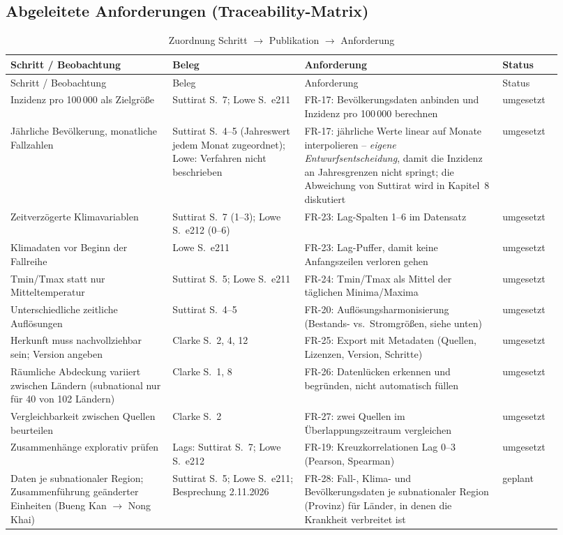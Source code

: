 \documentclass[11pt,a4paper]{article}
\begin{document}
\subsection{Abgeleitete Anforderungen (Traceability-Matrix)}

\begin{longtable}{@{}p{0.27\linewidth}p{0.22\linewidth}p{0.33\linewidth}p{0.1\linewidth}@{}}
\caption{Zuordnung Schritt $\rightarrow$ Publikation $\rightarrow$ Anforderung}\label{tab:trace}\\
\toprule
Schritt / Beobachtung & Beleg & Anforderung & Status \\
\midrule
\endfirsthead
\toprule
Schritt / Beobachtung & Beleg & Anforderung & Status \\
\midrule
\endhead
Inzidenz pro 100\,000 als Zielgröße & Suttirat S.~7; Lowe S.~e211 &
  FR-17: Bevölkerungsdaten anbinden und Inzidenz pro 100\,000 berechnen & umgesetzt \\
Jährliche Bevölkerung, monatliche Fallzahlen & Suttirat S.~4--5 (Jahreswert jedem Monat zugeordnet); Lowe: Verfahren nicht beschrieben &
  FR-17: jährliche Werte linear auf Monate interpolieren -- \emph{eigene Entwurfsentscheidung}, damit die Inzidenz an Jahresgrenzen nicht springt; die Abweichung von Suttirat wird in Kapitel~8 diskutiert & umgesetzt \\
Zeitverzögerte Klimavariablen & Suttirat S.~7 (1--3); Lowe S.~e212 (0--6) &
  FR-23: Lag-Spalten 1--6 im Datensatz & umgesetzt \\
Klimadaten vor Beginn der Fallreihe & Lowe S.~e211 &
  FR-23: Lag-Puffer, damit keine Anfangszeilen verloren gehen & umgesetzt \\
Tmin/Tmax statt nur Mitteltemperatur & Suttirat S.~5; Lowe S.~e211 &
  FR-24: Tmin/Tmax als Mittel der täglichen Minima/Maxima & umgesetzt \\
Unterschiedliche zeitliche Auflösungen & Suttirat S.~4--5 &
  FR-20: Auflösungsharmonisierung (Bestands- vs.\ Stromgrößen, siehe unten) & umgesetzt \\
Herkunft muss nachvollziehbar sein; Version angeben & Clarke S.~2, 4, 12 &
  FR-25: Export mit Metadaten (Quellen, Lizenzen, Version, Schritte) & umgesetzt \\
Räumliche Abdeckung variiert zwischen Ländern (subnational nur für 40 von 102 Ländern) & Clarke S.~1, 8 &
  FR-26: Datenlücken erkennen und begründen, nicht automatisch füllen & umgesetzt \\
Vergleichbarkeit zwischen Quellen beurteilen & Clarke S.~2 &
  FR-27: zwei Quellen im Überlappungszeitraum vergleichen & umgesetzt \\
Zusammenhänge explorativ prüfen & Lags: Suttirat S.~7; Lowe S.~e212 &
  FR-19: Kreuzkorrelationen Lag 0--3 (Pearson, Spearman) & umgesetzt \\
Daten je subnationaler Region; Zusammenführung geänderter Einheiten (Bueng Kan $\rightarrow$ Nong Khai) & Suttirat S.~5; Lowe S.~e211; Besprechung 2.11.2026 &
  FR-28: Fall-, Klima- und Bevölkerungsdaten je subnationaler Region (Provinz) für Länder, in denen die Krankheit verbreitet ist & geplant \\
\bottomrule
\end{longtable}
\end{document}
